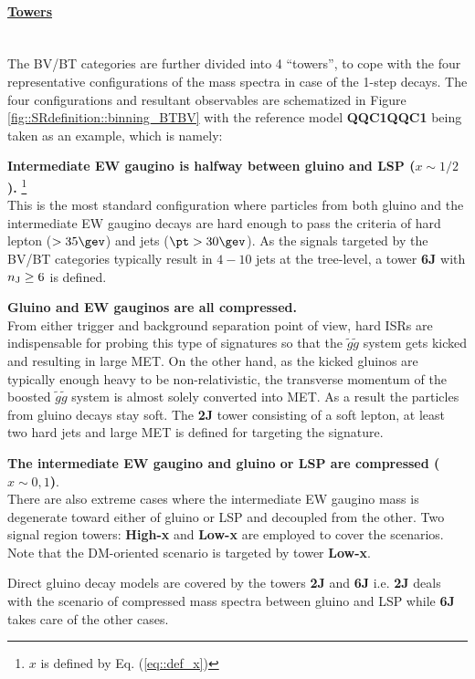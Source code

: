 \paragraph{\underline{\textbf{Towers}}} \mbox{} \\
The BV/BT categories are further divided into 4 ``towers'', 
to cope with the four representative configurations of the mass spectra in case of the 1-step decays. The four configurations and resultant observables are schematized in Figure \ref{fig::SRdefinition::binning_BTBV} with the reference model \textbf{QQC1QQC1} being taken as an example, which is namely:
%
\begin{description}
\item \textbf{Intermediate EW gaugino is halfway between gluino and LSP ($x \sim 1/2$).} 
\footnote{ $x$ is defined by Eq. (\ref{eq::def_x})}
\\
This is the most standard configuration where particles from both gluino and the intermediate EW gaugino decays are hard enough to pass the criteria of hard lepton ($>35\gev$) and jets ($\pt>30\gev$). As the signals targeted by the BV/BT categories typically result in $4-10$ jets at the tree-level, a tower \textbf{6J} with $n_{\mathrm{J}} \geq 6$ is defined. 

\item \textbf{Gluino and EW gauginos are all compressed.} \\ 
From either trigger and background separation point of view, hard ISRs are indispensable for probing this type of signatures so that the $\tilde{g}\tilde{g}$ system gets kicked and resulting in large MET. On the other hand, as the kicked gluinos are typically enough heavy to be non-relativistic, the transverse momentum of the boosted $\tilde{g}\tilde{g}$ system is almost solely converted into MET. As a result the particles from gluino decays stay soft. The \textbf{2J} tower consisting of a soft lepton, at least two hard jets and large MET is defined for targeting the signature.

\item \textbf{The intermediate EW gaugino and gluino or LSP are compressed ($x \sim 0,1$)}.  \\
There are also extreme cases where the intermediate EW gaugino mass is degenerate toward either of gluino or LSP and decoupled from the other. Two signal region towers: \textbf{High-x} and \textbf{Low-x} are employed to cover the scenarios. Note that the DM-oriented scenario is targeted by tower \textbf{Low-x}.
\end{description}
%
\noindent Direct gluino decay models are covered by the towers \textbf{2J} and \textbf{6J} i.e. \textbf{2J} deals with the scenario of compressed mass spectra between gluino and LSP while \textbf{6J} takes care of the other cases. \\

